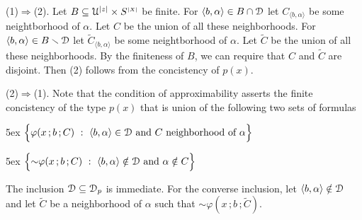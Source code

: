 \documentclass{amsproc}
\makeatletter
\theoremstyle{mio}
\providecommand{\proofNameStyle}{\bfseries}
\renewenvironment{proof}[1][\proofname]{\par
  \pushQED{\qed}%
  \normalfont%
  \trivlist
  \item[\hskip\labelsep
        \proofNameStyle
    #1\@addpunct{.}]\ignorespaces
}{%
  \popQED\endtrivlist\@endpefalse
}
\makeatother
\begin{document}
\begin{proof}
  (1)$\Rightarrow$(2). Let $B\subseteq {\EuScript U}^{|z|}\times S^{\scriptscriptstyle|X|}$ be finite.
  For $\langle b,\alpha\rangle\in B\cap{\EuScript D}$ let $C_{\langle b,\alpha\rangle}$ be some neightborhood of $\alpha$. %
  Let $C$ be the union of all these neighborhoods.
  For $\langle b,\alpha\rangle\in B\smallsetminus{\EuScript D}$ let $\tilde C_{\langle b,\alpha\rangle}$ be some neightborhood of $\alpha$. %
  Let $\tilde C$ be the union of all these neighborhoods.
  By the finiteness of $B$, we can require that $C$ and $\tilde C$ are disjoint. 
  Then (2) follows from the concistency of $p(x)$.

  (2)$\Rightarrow$(1). Note that the condition of approximability asserts the finite concistency of the type $p(x)$ that is union of the following two sets of formulas

\noindent\kern5ex $\Big\{\varphi(x\,;b\,;C)\ :\ \langle b,\alpha\rangle\in{\EuScript D}\textrm{ and }C\textrm{ neighborhood of }\alpha\Big\}$


\noindent\kern5ex $\Big\{{\sim}\varphi(x\,;b\,;C)\ :\ \langle b,\alpha\rangle\notin{\EuScript D}\textrm{ and }\alpha\notin C\Big\}$

The inclusion ${\EuScript D}\subseteq{\EuScript D}_p$ is immediate.
For the converse inclusion, let $\langle b,\alpha\rangle\notin{\EuScript D}$ and let $\tilde C$ be a neighborhood of $\alpha$ such that ${\sim}\varphi(x\,;b\,;\tilde C)$.
\end{proof}

\section{}

\def\ceq#1#2#3{\parbox[t]{23ex}{$\displaystyle #1$}\parbox{6ex}{\hfil $#2$}{$\displaystyle #3$}}

\newcommand\biburl[1]{\url{#1}}
\end{document}
